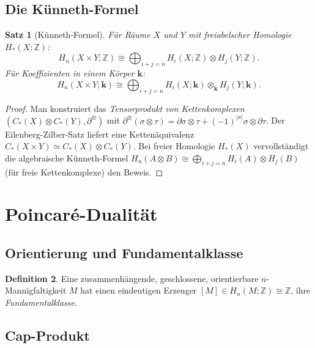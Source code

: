 \documentclass[12pt,a4paper]{amsart}
\newtheorem{theorem}{Satz}[section]
\theoremstyle{definition}
\newtheorem{definition}[theorem]{Definition}
\begin{document}
\subsection{Die K\"unneth-Formel}

\begin{theorem}[K\"unneth-Formel]
\label{thm:kuenneth}
F\"ur R\"aume $X$ und $Y$ mit freiabelscher Homologie $H_*(X;\mathbb{Z})$:
\[
  H_n(X \times Y;\mathbb{Z})
  \cong \bigoplus_{i+j=n} H_i(X;\mathbb{Z}) \otimes H_j(Y;\mathbb{Z}).
\]
F\"ur Koeffizienten in einem K\"orper $\mathbf{k}$:
\[
  H_n(X \times Y; \mathbf{k})
  \cong \bigoplus_{i+j=n} H_i(X;\mathbf{k}) \otimes_\mathbf{k} H_j(Y;\mathbf{k}).
\]
\end{theorem}
\begin{proof}
Man konstruiert das \emph{Tensorprodukt von Kettenkomplexen}
$(C_*(X) \otimes C_*(Y), \partial^\otimes)$ mit
$\partial^\otimes(\sigma \otimes \tau) = \partial\sigma \otimes \tau
+ (-1)^{|\sigma|} \sigma \otimes \partial\tau$.
Der Eilenberg-Zilber-Satz liefert eine Kett\-en\"aquivalenz
$C_*(X \times Y) \simeq C_*(X) \otimes C_*(Y)$.
Bei freier Homologie $H_*(X)$ vervollständigt die algebraische K\"unneth-Formel
$H_n(A \otimes B) \cong \bigoplus_{i+j=n} H_i(A) \otimes H_j(B)$
(f\"ur freie Kettenkomplexe) den Beweis.
\end{proof}

\section{Poincar\'e-Dualit\"at}
\label{sec:poincare}

\subsection{Orientierung und Fundamentalklasse}

\begin{definition}
Eine zusammenh\"angende, geschlossene, orientierbare $n$-Mannigfaltigkeit $M$
hat einen eindeutigen Erzeuger $[M] \in H_n(M;\mathbb{Z}) \cong \mathbb{Z}$,
ihre \emph{Fundamentalklasse}.
\end{definition}

\subsection{Cap-Produkt}
\end{document}
